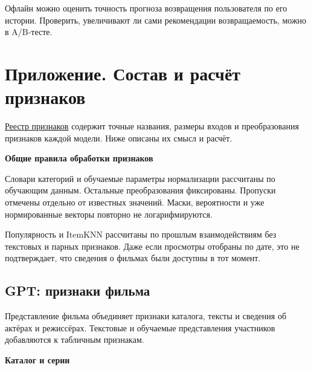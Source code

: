 \documentclass[11pt,a4paper]{article}
\begin{document}
Офлайн можно оценить точность прогноза возвращения пользователя по его истории. Проверить, увеличивают ли сами рекомендации возвращаемость, можно в A/B-тесте.

\section{Приложение. Состав и расчёт признаков}

\href{https://github.com/suprend/kion-rl-recsys/blob/5c6858e46705fb4baa350d36914905b061376ed3/report-latex/feature-schema.json}{Реестр признаков} содержит точные названия, размеры входов и преобразования признаков каждой модели. Ниже описаны их смысл и расчёт.

\textbf{Общие правила обработки признаков}

Словари категорий и обучаемые параметры нормализации рассчитаны по обучающим данным. Остальные преобразования фиксированы. Пропуски отмечены отдельно от известных значений. Маски, вероятности и уже нормированные векторы повторно не логарифмируются.

Популярность и ItemKNN рассчитаны по прошлым взаимодействиям без текстовых и парных признаков. Даже если просмотры отобраны по дате, это не подтверждает, что сведения о фильмах были доступны в тот момент.


\newpage

\subsection{GPT: признаки фильма}

Представление фильма объединяет признаки каталога, тексты и сведения об актёрах и режиссёрах. Текстовые и обучаемые представления участников добавляются к табличным признакам.

\textbf{Каталог и серии}
\end{document}
